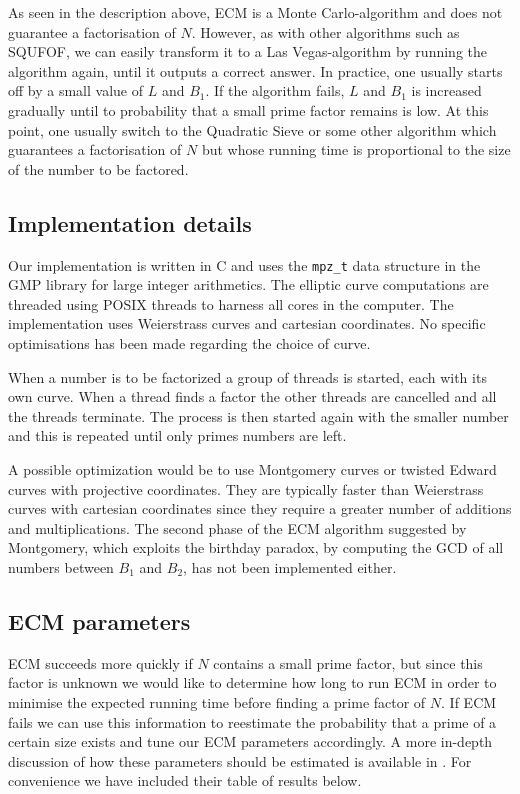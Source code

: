 \documentclass{article}
\begin{document}
\noindent
As seen in the description above, ECM is a Monte Carlo-algorithm and does not guarantee a factorisation of $N$. However, as with other algorithms such as SQUFOF, we can easily transform it to a Las Vegas-algorithm by running the algorithm again, until it outputs a correct answer. In practice, one usually starts off by a small value of $L$ and $B_1$. If the algorithm fails, $L$ and $B_1$ is increased gradually until to probability that a small prime factor remains is low. At this point, one usually switch to the Quadratic Sieve or some other algorithm which guarantees a factorisation of $N$ but whose running time is proportional to the size of the number to be factored. 

\subsection{Implementation details}
Our implementation is written in C and uses the \verb!mpz_t! data structure in the GMP library for large integer arithmetics. The elliptic curve computations are threaded using POSIX threads to harness all cores in the computer. The implementation uses Weierstrass curves and cartesian coordinates. No specific optimisations has been made regarding the choice of curve. 

When a number is to be factorized a group of threads is started, each with its own curve. When a thread finds a factor the other threads are cancelled and all the threads terminate. The process is then started again with the smaller number and this is repeated until only primes numbers are left.

A possible optimization would be to use Montgomery curves or twisted Edward curves with projective coordinates. They are typically faster than Weierstrass curves with cartesian coordinates since they require a greater number of additions and multiplications. The second phase of the ECM algorithm suggested by Montgomery, which exploits the birthday paradox, by computing the GCD of all numbers between $B_1$ and $B_2$, has not been implemented either.

\subsection{ECM parameters}
\label{ecm-params}
ECM succeeds more quickly if $N$ contains a small prime factor, but since this factor is unknown we would like to determine how long to run ECM in order to minimise the expected running time before finding a prime factor of $N$. If ECM fails we can use this information to reestimate the probability that a prime of a certain size exists and tune our ECM parameters accordingly. A more in-depth discussion of how these parameters should be estimated is available in \cite{Silverman93}. For convenience we have included their table of results below.
\end{document}

